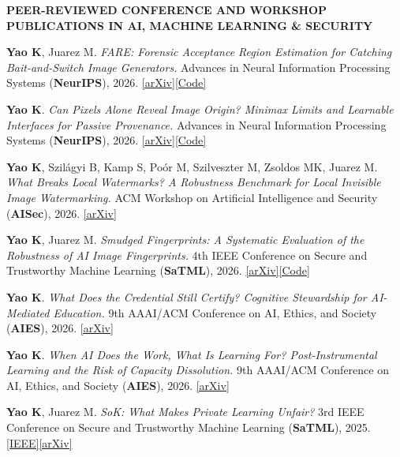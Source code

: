 \documentclass[10pt,a4paper]{article}
\newcommand{\subhead}[1]{%
  \Needspace{3\baselineskip}%
  \vspace{3.8pt}%
  {\headingfont\fontsize{8.45}{10.0}\selectfont\bfseries\color{accent}\addfontfeature{LetterSpace=2.5}\MakeUppercase{#1}}\par
  \vspace{1.8pt}%
}
\newcommand{\publink}[2]{\href{#1}{\fontsize{8.0}{9.4}\selectfont\color{accent}[#2]}}
\newcommand{\cofirst}{\raisebox{0.35ex}{\fontsize{6.6}{7}\selectfont *}}
\begin{document}
\subhead{Peer-Reviewed Conference and Workshop Publications in AI, Machine Learning \& Security}
\begin{enumerate}[label={\fontsize{8.2}{9.7}\selectfont\color{muted}\headingfont[C\arabic*]}, leftmargin=2.3em, labelsep=0.55em, topsep=3.0pt, itemsep=4.2pt, parsep=0pt]
  \item \textbf{Yao K}, Juarez M. \textit{FARE: Forensic Acceptance Region Estimation for Catching Bait-and-Switch Image Generators.} Advances in Neural Information Processing Systems (\textbf{NeurIPS}), 2026. \mbox{\publink{https://arxiv.org/abs/2609.30982}{arXiv}\;\publink{https://github.com/kaikaiyao/FARE}{Code}}
  \item \textbf{Yao K}. \textit{Can Pixels Alone Reveal Image Origin? Minimax Limits and Learnable Interfaces for Passive Provenance.} Advances in Neural Information Processing Systems (\textbf{NeurIPS}), 2026. \mbox{\publink{https://arxiv.org/abs/2609.30997}{arXiv}\;\publink{https://github.com/kaikaiyao/pixels-alone-provenance}{Code}}
  \item \textbf{Yao K}\cofirst, Szil\'{a}gyi B\cofirst, Kamp S, Po\'{o}r M, Szilveszter M, Zsoldos MK, Juarez M. \textit{What Breaks Local Watermarks? A Robustness Benchmark for Local Invisible Image Watermarking.} ACM Workshop on Artificial Intelligence and Security (\textbf{AISec}), 2026. \publink{https://arxiv.org/abs/2609.16832}{arXiv}
  \item \textbf{Yao K}, Juarez M. \textit{Smudged Fingerprints: A Systematic Evaluation of the Robustness of AI Image Fingerprints.} 4th IEEE Conference on Secure and Trustworthy Machine Learning (\textbf{SaTML}), 2026. \mbox{\publink{https://arxiv.org/abs/2512.11771}{arXiv}\;\publink{https://github.com/kaikaiyao/SmudgedFingerprints}{Code}}
  \item \textbf{Yao K}. \textit{What Does the Credential Still Certify? Cognitive Stewardship for AI-Mediated Education.} 9th AAAI/ACM Conference on AI, Ethics, and Society (\textbf{AIES}), 2026. \publink{https://arxiv.org/abs/2607.19988}{arXiv}
  \item \textbf{Yao K}. \textit{When AI Does the Work, What Is Learning For? Post-Instrumental Learning and the Risk of Capacity Dissolution.} 9th AAAI/ACM Conference on AI, Ethics, and Society (\textbf{AIES}), 2026. \publink{https://arxiv.org/abs/2607.28041}{arXiv}
  \item \textbf{Yao K}, Juarez M. \textit{SoK: What Makes Private Learning Unfair?} 3rd IEEE Conference on Secure and Trustworthy Machine Learning (\textbf{SaTML}), 2025. \mbox{\publink{https://ieeexplore.ieee.org/document/10992380}{IEEE}\;\publink{https://arxiv.org/abs/2501.14414}{arXiv}}
\end{enumerate}
\end{document}

